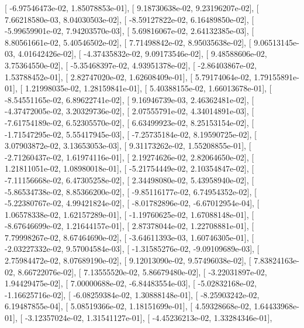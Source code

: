 \documentclass{article}
\begin{document}
       [ -6.97546473e-02,   1.85078853e-01],
       [  9.18730638e-02,   9.23196207e-02],
       [  7.66218580e-03,   8.04030503e-02],
       [ -8.59127822e-02,   6.16489850e-02],
       [ -5.99659901e-02,   7.94203570e-03],
       [  5.69816067e-02,   2.64132385e-03],
       [  8.80561661e-02,   5.40546502e-02],
       [  7.71498842e-02,   8.95035638e-02],
       [  9.06513145e-03,   4.01642426e-02],
       [ -4.37435832e-02,   9.09173546e-02],
       [  9.48588606e-02,   3.75364550e-02],
       [ -5.35468397e-02,   4.93951378e-02],
       [ -2.86403867e-02,   1.53788452e-01],
       [  2.82747020e-02,   1.62608409e-01],
       [  5.79174064e-02,   1.79155891e-01],
       [  1.21998035e-02,   1.28159841e-01],
       [  5.40388155e-02,   1.66013678e-01],
       [ -8.54551165e-02,   6.89622741e-02],
       [  9.16946739e-03,   2.46362481e-02],
       [ -4.37472005e-02,   3.20329736e-02],
       [  2.07555791e-02,   4.34014891e-03],
       [ -7.61754189e-02,   6.52305570e-02],
       [  6.63499923e-02,   8.25153154e-02],
       [ -1.71547295e-02,   5.55417945e-03],
       [ -7.25735184e-02,   8.19590725e-02],
       [  3.07903872e-02,   3.13653053e-03],
       [  9.31173262e-02,   1.55208855e-01],
       [ -2.71260437e-02,   1.61974116e-01],
       [  2.19274626e-02,   2.82064650e-02],
       [  1.21811051e-02,   1.08980018e-01],
       [ -5.21754449e-02,   2.10354847e-02],
       [ -7.11156668e-02,   6.47305258e-02],
       [  2.34498080e-02,   5.43958940e-02],
       [ -5.86534738e-02,   8.85366200e-02],
       [ -9.85116177e-02,   6.74954352e-02],
       [ -5.22380767e-02,   4.99421824e-02],
       [ -8.01782896e-02,  -6.67012954e-04],
       [  1.06578338e-02,   1.62157289e-01],
       [ -1.19760625e-02,   1.67088148e-01],
       [ -8.67646699e-02,   1.21644157e-01],
       [  2.87378044e-02,   1.22708881e-01],
       [  7.79998267e-02,   8.67464690e-02],
       [ -3.64611393e-03,   1.60746305e-01],
       [ -2.03227332e-02,   9.57004584e-03],
       [ -1.31585276e-02,  -9.09109689e-03],
       [  2.75984472e-02,   8.07689190e-02],
       [  9.12013090e-02,   9.57496038e-02],
       [  7.83824163e-02,   8.66722076e-02],
       [  7.13555520e-02,   5.86679480e-02],
       [ -3.22031897e-02,   1.94429475e-02],
       [  7.00000688e-02,  -6.84483554e-03],
       [ -5.02832168e-02,  -1.16625716e-02],
       [ -6.08259384e-02,   1.30888148e-01],
       [ -8.25903242e-02,   6.19487855e-04],
       [  5.08519366e-02,   1.18151699e-01],
       [  4.59328668e-02,   1.64433968e-01],
       [ -3.12357024e-02,   1.31541127e-01],
       [ -4.45236213e-02,   1.33284346e-01],
\end{document}
